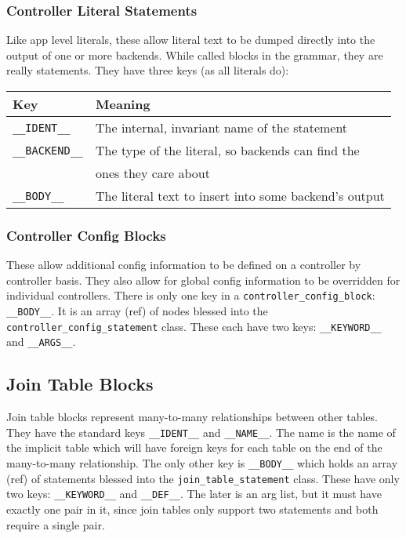 \subsubsection*{Controller Literal Statements}

Like app level literals, these allow literal text to be dumped directly
into the output of one or more backends.  While called blocks in the
grammar, they are really statements.  They have three keys (as all
literals do):

\begin{tabular}{l|l}
Key                & Meaning                                               \\
\hline
\verb+__IDENT__+   & The internal, invariant name of the statement         \\
\verb+__BACKEND__+ & The type of the literal, so backends can find the     \\
                   & ones they care about                                  \\
\verb+__BODY__+    & The literal text to insert into some backend's output \\
\end{tabular}

\subsubsection*{Controller Config Blocks}

These allow additional config information to be defined on a controller
by controller basis.  They also allow for global config information to
be overridden for individual controllers.  There is only one key in
a \verb+controller_config_block+: \verb+__BODY__+.  It is an array
(ref) of nodes blessed into the \verb+controller_config_statement+ class.
These each have two keys: \verb+__KEYWORD__+ and \verb+__ARGS__+.

\subsection*{Join Table Blocks}

Join table blocks represent many-to-many relationships between other
tables.  They have the standard keys \verb+__IDENT__+ and \verb+__NAME__+.
The name is the name of the implicit table which will have foreign keys
for each table on the end of the many-to-many relationship.  The only
other key is \verb+__BODY__+ which holds an array (ref) of statements
blessed into the \verb+join_table_statement+ class.  These have only
two keys: \verb+__KEYWORD__+ and \verb+__DEF__+.  The later is an arg
list, but it must have exactly one pair in it, since join tables only
support two statements and both require a single pair.

